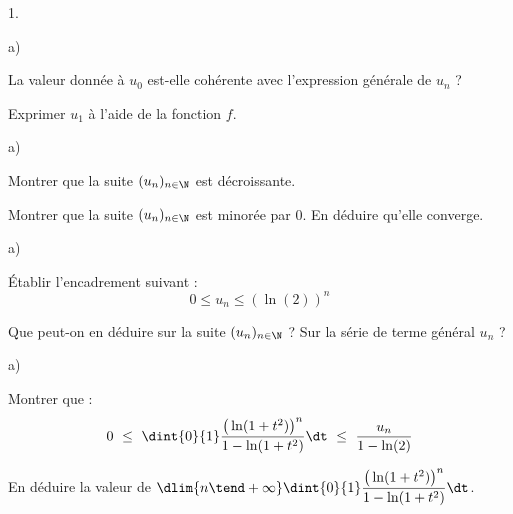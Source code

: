 \begin{noliste}{1.}
  \setcounter{enumi}{6} %
  \setlength{\itemsep}{4mm}
\item
  \begin{noliste}{a)}
    \setlength{\itemsep}{2mm}
  \item La valeur donnée à $u_0$ est-elle cohérente avec l'expression
    générale de $u_n$ ?

    

  \item Exprimer $u_1$ à l'aide de la fonction $f$.

    
  \end{noliste}

\item
  \begin{noliste}{a)}
    \setlength{\itemsep}{2mm}
  \item Montrer que la suite $(u_n)_{n \in \N}$ est décroissante.

    

  \item Montrer que la suite $(u_n)_{n \in \N}$ est minorée par
    $0$. En déduire qu'elle converge.

    
  \end{noliste}  

\item
  \begin{noliste}{a)}
    \setlength{\itemsep}{2mm}
  \item Établir l'encadrement suivant :
    \[
    0 \leq u_n \leq (\ln(2))^n
    \]

    

  \item Que peut-on en déduire sur la suite $(u_n)_{n \in \N}$ ? Sur
    la série de terme général $u_n$ ?

    
  \end{noliste}  

\item
  \begin{noliste}{a)}
    \setlength{\itemsep}{2mm}
  \item Montrer que : 
    \[
    0 \ \leq \ \dint{0}{1} \dfrac{\big( \ln(1 + t^2) \big)^n}{1 -
      \ln(1 + t^2)} \dt \ \leq \ \dfrac{u_n}{1 - \ln(2)}
    \]

    

  \item En déduire la valeur de $\dlim{n \tend +\infty} \dint{0}{1}
    \dfrac{\big( \ln(1 + t^2) \big)^n}{1 - \ln(1 + t^2)} \dt$.


\end{noliste}
\end{noliste}
